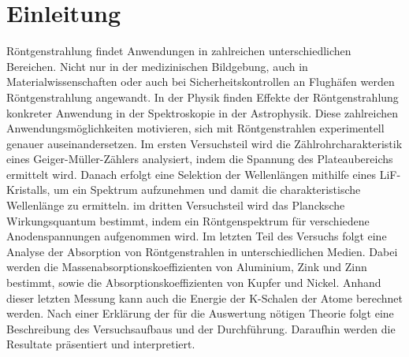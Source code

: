 \section{Einleitung}
Röntgenstrahlung findet Anwendungen in zahlreichen unterschiedlichen Bereichen. Nicht nur in der medizinischen Bildgebung, auch in Materialwissenschaften oder auch bei Sicherheitskontrollen an Flughäfen werden Röntgenstrahlung angewandt.  In der Physik finden Effekte der Röntgenstrahlung konkreter Anwendung in der Spektroskopie in der Astrophysik. Diese zahlreichen Anwendungsmöglichkeiten motivieren, sich mit Röntgenstrahlen experimentell genauer auseinandersetzen. Im ersten Versuchsteil wird die Zählrohrcharakteristik eines Geiger-Müller-Zählers analysiert, indem die Spannung des Plateaubereichs ermittelt wird. Danach erfolgt eine Selektion der Wellenlängen mithilfe eines LiF-Kristalls, um ein Spektrum aufzunehmen und damit die charakteristische Wellenlänge zu ermitteln. im dritten Versuchsteil wird das Plancksche Wirkungsquantum bestimmt, indem ein Röntgenspektrum für verschiedene Anodenspannungen aufgenommen wird. Im letzten Teil des Versuchs folgt eine Analyse der Absorption von Röntgenstrahlen in unterschiedlichen Medien. Dabei werden die Massenabsorptionskoeffizienten von Aluminium, Zink und Zinn bestimmt, sowie die Absorptionskoeffizienten von Kupfer und Nickel. Anhand dieser letzten Messung kann auch die Energie der K-Schalen der Atome berechnet werden.  
Nach einer Erklärung der für die Auswertung nötigen Theorie folgt eine Beschreibung des Versuchsaufbaus und der Durchführung. Daraufhin werden die Resultate präsentiert und interpretiert.

